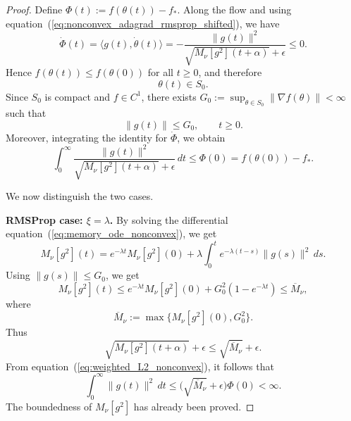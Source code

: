 \documentclass{article} %
\begin{document}
\begin{proof}
Define $\Phi(t):=f(\theta(t))-f_*$. Along the flow and using equation~(\ref{eq:nonconvex_adagrad_rmsprop_shifted}), we have
\[
    \dot\Phi(t)
    =
    \langle g(t),\dot\theta(t)\rangle
    =
    -
    \frac{\|g(t)\|^2}{\sqrt{M_\nu[g^2](t+\alpha)}+\epsilon}
    \leq0.
\]
Hence \(f(\theta(t))\leq f(\theta(0))\) for all \(t\geq0\), and therefore
\[
    \theta(t)\in S_0.
\]
Since \(S_0\) is compact and \(f\in C^1\), there exists $G_0:=\sup_{\theta\in S_0}\|\nabla f(\theta)\|<\infty$ such that
\[
    \|g(t)\|\leq G_0,
    \qquad t\geq0.
\]
Moreover, integrating the identity for \(\dot\Phi\), we obtain
\begin{equation}
\label{eq:weighted_L2_nonconvex}
    \int_0^\infty
    \frac{\|g(t)\|^2}{\sqrt{M_\nu[g^2](t+\alpha)}+\epsilon}\,dt
    \leq
    \Phi(0)
    =
    f(\theta(0))-f_*.
\end{equation}

We now distinguish the two cases.

\medskip

\noindent\textbf{RMSProp case: \(\xi=\lambda\).}
By solving the differential equation~(\ref{eq:memory_ode_nonconvex}), we get
\[
    M_\nu[g^2](t)
    =
    e^{-\lambda t}M_\nu[g^2](0)
    +
    \lambda\int_0^t e^{-\lambda(t-s)}\|g(s)\|^2\,ds.
\]
Using \(\|g(s)\|\leq G_0\), we get
\[
    M_\nu[g^2](t)
    \leq
    e^{-\lambda t}M_\nu[g^2](0)
    +
    G_0^2(1-e^{-\lambda t})
    \leq
    \overline M_\nu,
\]
where
\[
    \overline M_\nu:=\max\{M_\nu[g^2](0),G_0^2\}.
\]
Thus
\[
    \sqrt{M_\nu[g^2](t+\alpha)}+\epsilon
    \leq
    \sqrt{\overline M_\nu}+\epsilon.
\]
From equation~(\ref{eq:weighted_L2_nonconvex}), it follows that
\[
    \int_0^\infty \|g(t)\|^2\,dt
    \leq
    \bigl(\sqrt{\overline M_\nu}+\epsilon\bigr)\Phi(0)
    <\infty.
\]
The boundedness of \(M_\nu[g^2]\) has already been proved.

\medskip


\end{proof}
\end{document}
